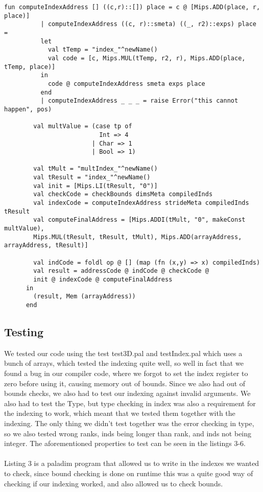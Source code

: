 \begin{lstlisting}[style=MLStyle, caption=Implementation of indexing for the compiler]
        fun computeIndexAddress [] ((c,r)::[]) place = c @ [Mips.ADD(place, r, place)] 
          | computeIndexAddress ((c, r)::smeta) ((_, r2)::exps) place =
          let
            val tTemp = "index_"^newName()
            val code = [c, Mips.MUL(tTemp, r2, r), Mips.ADD(place, tTemp, place)] 
          in
            code @ computeIndexAddress smeta exps place
          end
          | computeIndexAddress _ _ _ = raise Error("this cannot happen", pos)

        val multValue = (case tp of
                          Int => 4
                        | Char => 1
                        | Bool => 1)
                          
        val tMult = "multIndex_"^newName()
        val tResult = "index_"^newName()
        val init = [Mips.LI(tResult, "0")]
        val checkCode = checkBounds dimsMeta compiledInds 
        val indexCode = computeIndexAddress strideMeta compiledInds tResult 
        val computeFinalAddress = [Mips.ADDI(tMult, "0", makeConst multValue),
        Mips.MUL(tResult, tResult, tMult), Mips.ADD(arrayAddress, arrayAddress, tResult)] 
  
        val indCode = foldl op @ [] (map (fn (x,y) => x) compiledInds)
        val result = addressCode @ indCode @ checkCode @ 
        init @ indexCode @ computeFinalAddress 
      in
        (result, Mem (arrayAddress)) 
      end	
\end{lstlisting}



\subsection{Testing}
We tested our code using the test test3D.pal and testIndex.pal which uses a bunch of arrays, which tested the indexing quite well, 
so well in fact that we found a bug in our compiler code, where we forgot to set the index register to zero before using it, 
causing memory out of bounds. Since we also had out of bounds checks, we also had to test our indexing against invalid arguments. 
We also had to test the Type, but type checking in index was also a requirement for the indexing to work, 
which meant that we tested them together with the indexing. The only thing we didn't test together was the error checking in type, 
so we also tested wrong ranks, inds being longer than rank, and inds not being integer. The aforementioned properties to test can be
seen in the listings 3-6.
\\
\\
Listing 3 is a paladim program that allowed us to write in the indexes we wanted to check, since bound checking is done on runtime this was
a quite good way of checking if our indexing worked, and also allowed us to check bounds.

